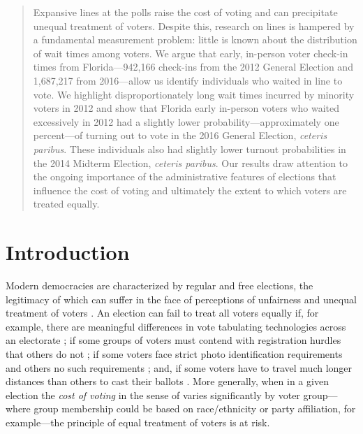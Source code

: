 \documentclass[12pt,titlepage]{article}
\begin{document}


\begin{abstract}
  \noindent 
  Expansive lines at the polls raise the cost of voting and can
  precipitate unequal treatment of voters.  Despite this, research on
  lines is hampered by a fundamental measurement problem: little is
  known about the distribution of wait times among voters.  We argue
  that early, in-person voter check-in times from Florida---942,166
  check-ins from the 2012 General Election and 1,687,217 from
  2016---allow us identify individuals who waited in line to vote.  We
  highlight disproportionately long wait times incurred by minority
  voters in 2012 and show that Florida early in-person voters who
  waited excessively in 2012 had a slightly lower
  probability---approximately one percent---of turning out to vote in
  the 2016 General Election, \emph{ceteris paribus}.  These
  individuals also had slightly lower turnout probabilities in the
  2014 Midterm Election, \emph{ceteris paribus}.  Our results draw
  attention to the ongoing importance of the administrative features
  of elections that influence the cost of voting and ultimately the
  extent to which voters are treated equally.
\end{abstract}



\newpage
\section*{Introduction}

Modern democracies are characterized by regular and free elections,
the legitimacy of which can suffer in the face of perceptions of
unfairness and unequal treatment of voters \citep{norris2014electoral}.
An election can fail to treat all voters equally if, for example,
there are meaningful differences in vote tabulating technologies
across an electorate \citep[e.g.,][]{kimballkropf:tech}; if some
groups of voters must contend with registration hurdles that others do
not \cite[e.g.,][]{ansolhersh:registration}; if some voters face
strict photo identification requirements and others no such
requirements \citep[e.g.,][]{benteleetal:newjimcrow}; and, if some
voters have to travel much longer distances than others to cast their
ballots \citep[e.g.,][]{dyckgimpel:distance}.  More generally, when in
a given election the \emph{cost of voting} in the sense of
\cite{downs:econtheory} varies significantly by voter group---where
group membership could be based on race/ethnicity or party
affiliation, for example---the principle of equal treatment of voters
is at risk.
\end{document}
